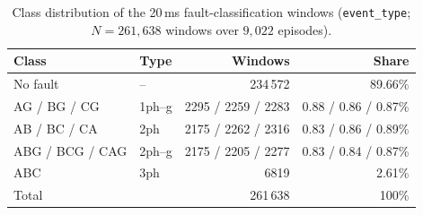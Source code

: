 \begin{table}[ht]
\centering
\small
\caption{Class distribution of the 20\,ms fault-classification windows (\texttt{event\_type}; $N = 261{,}638$ windows over $9{,}022$ episodes).}
\label{tab:class_distribution}
\begin{tabular}{llrr}
\toprule
\textbf{Class} & \textbf{Type} & \textbf{Windows} & \textbf{Share} \\
\midrule
No fault        & --       & 234\,572            & 89.66\% \\
AG / BG / CG    & 1ph--g   & 2295 / 2259 / 2283  & 0.88 / 0.86 / 0.87\% \\
AB / BC / CA    & 2ph      & 2175 / 2262 / 2316  & 0.83 / 0.86 / 0.89\% \\
ABG / BCG / CAG & 2ph--g   & 2175 / 2205 / 2277  & 0.83 / 0.84 / 0.87\% \\
ABC             & 3ph      & 6819                & 2.61\% \\
\midrule
Total           &          & 261\,638            & 100\% \\
\bottomrule
\end{tabular}
\end{table}
